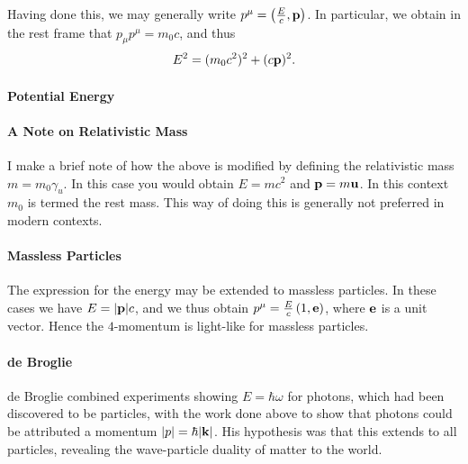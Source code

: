 Having done this, we may generally write $p^{\mu} = \left(\frac{E}{c}, \vb{p}\right)$. In particular, we obtain in the rest frame that $p_{\mu}p^{\mu} = m_{0}c$, and thus
\begin{align*}
	E^{2} = (m_{0}c^{2})^{2} + (c\vb{p})^{2}.
\end{align*}

\paragraph{Potential Energy}

\paragraph{A Note on Relativistic Mass}
I make a brief note of how the above is modified by defining the relativistic mass $m = m_{0}\gamma_{u}$. In this case you would obtain $E = mc^{2}$ and $\vb{p} = m\vb{u}$. In this context $m_{0}$ is termed the rest mass. This way of doing this is generally not preferred in modern contexts.

\paragraph{Massless Particles}
The expression for the energy may be extended to massless particles. In these cases we have $E = \abs{\vb{p}}c$, and we thus obtain $p^{\mu} = \frac{E}{c}\left(1, \vb{e}\right)$, where $\vb{e}$ is a unit vector. Hence the $4$-momentum is light-like for massless particles.

\paragraph{de Broglie}
de Broglie combined experiments showing $E = \hbar\omega$ for photons, which had been discovered to be particles, with the work done above to show that photons could be attributed a momentum $\abs{p} = \hbar\abs{\vb{k}}$. His hypothesis was that this extends to all particles, revealing the wave-particle duality of matter to the world.